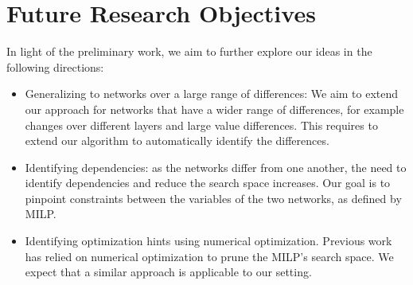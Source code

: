 

\section{Future Research Objectives}
In light of the preliminary work, we aim to further explore our ideas in the following directions:
\begin{itemize}
    \item Generalizing to networks over a large range of differences: We aim to extend our approach for networks that have a wider range of differences, for example changes over different layers and large value differences. This requires to extend our algorithm to automatically identify the differences.
    \item Identifying dependencies: as the networks differ from one another, the need to identify dependencies and reduce the search space increases. Our goal is to pinpoint constraints between the variables of the two networks, as defined by MILP.
    \item Identifying optimization hints using numerical optimization. Previous work~\cite{VHAGAR} has relied on numerical optimization to prune the MILP's search space. We expect that a similar approach is applicable to our setting. %
\end{itemize}
